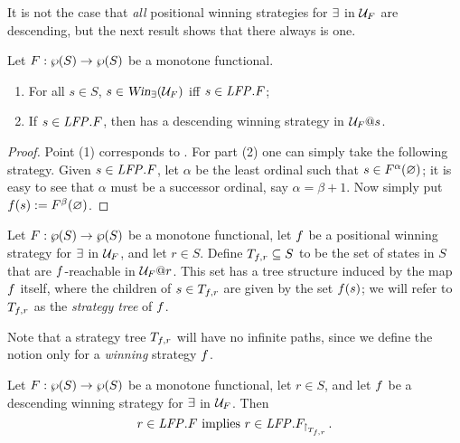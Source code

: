 It is not the case that \emph{all} positional winning strategies for $\exists$ 
in $\mathcal{U}_{F}$ are descending, but the next result shows that there always is one.

\begin{proposition}
\label{p:unfg}
Let $F: \wp(S)\to \wp(S)$ be a monotone functional. 
\begin{enumerate}[(1)]
\item
For all $s \in S$, $s \in \text{\sl Win}_{\exists}(\mathcal{U}_{F})$ iff $s \in \mathit{LFP}. F$;
\item 
If $s \in \mathit{LFP}. F$, then \eloise has a descending winning strategy in 
$\mathcal{U}_{F}@s$.
\end{enumerate}
\end{proposition}

\begin{proof}
Point (1) corresponds to \cite[Theorem 3.14(2)]{Ven08}.
For part (2) one can simply take the following strategy.
Given $s \in \mathit{LFP}.F$, let $\alpha$ be the least ordinal such that $s \in 
F^{\alpha}(\varnothing)$; it is easy to see that $\alpha$ must be a successor ordinal,
say $\alpha = \beta + 1$. 
Now simply put $f(s) \mathrel{:=}  F^{\beta}(\varnothing)$.
\end{proof}

\begin{definition}
\label{d:str-tree}
Let $F: \wp(S)\to \wp(S)$ be a monotone functional, let $f$ be a 
positional winning strategy for $\exists$ in $\mathcal{U}_{F}$, and let $r \in S$. 
Define $T_{f,r} \subseteq S$ to be the set of states in $S$ that are 
$f$-reachable in $\mathcal{U}_{F}@r$.
This set has a tree structure induced by the map $f$ itself, where the 
children of $s \in T_{f,r}$ are given by the set $f(s)$; we will
refer to $T_{f,r}$ as the \emph{strategy tree} of
$f$.
\end{definition}
Note that a strategy tree $T_{f,r}$ will have no infinite paths, since we
define the notion only for a \emph{winning} strategy $f$.

\begin{proposition}
\label{p:afmc-2}
Let $F: \wp(S)\to \wp(S)$ be a monotone functional, let $r \in S$, and let 
$f$ be a descending winning strategy for $\exists$ in $\mathcal{U}_{F}$.
Then
\begin{equation}
\label{eq:afmc3}
r \in \mathit{LFP}. F \text{ implies } r \in \mathit{LFP}. F_{{\upharpoonright}_{T_{f,r}}\,}.
\end{equation}
\end{proposition}

